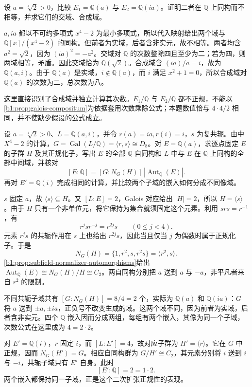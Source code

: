 \begin{exercise}\label{b1:ex:19-two-fourth-root-fields}
	设 \(a=\sqrt[4]2>0\)，比较 \(E_1=\mathbb Q(a)\) 与 \(E_2=\mathbb Q(ia)\)。证明二者在 \(\mathbb Q\) 上同构而不相等，并求它们的交域、合成域。
\end{exercise}
\begin{solution}
	\(a,ia\) 都以不可约多项式 \(x^4-2\) 为最小多项式，所以代入映射给出两个域与 \(\mathbb Q[x]/(x^4-2)\) 的同构。但前者为实域，后者含非实元，故不相等。两者均含 \(a^2=\sqrt2\)，因为 \((ia)^2=-a^2\)。交域对 \(\mathbb Q\) 的次数整除四且至少为二；若为四，则两域相等，矛盾。因此交域恰为 \(\mathbb Q(\sqrt2)\)。合成域含 \((ia)/a=i\)，故为 \(\mathbb Q(a,i)\)。由于 \(\mathbb Q(a)\) 是实域，\(i\notin\mathbb Q(a)\)，而 \(i\) 满足 \(x^2+1=0\)，所以合成域对 \(\mathbb Q(a)\) 的次数为二，总次数为八。

	这里直接识别了合成域并独立计算其次数。\(E_1/\mathbb Q\) 与 \(E_2/\mathbb Q\) 都不正规，不能以\cref{b1:prop:galois-compositum}为依据套用次数乘除公式；本题数值恰与 \(4\cdot4/2\) 相同，并不使缺少假设的公式成立。
\end{solution}

\begin{exercise}\label{b1:ex:19-normalizer-automorphisms}
	设 \(a=\sqrt[4]2>0\)、\(L=\mathbb Q(a,i)\)，并令 \(r(a)=ia,r(i)=i\)，\(s\) 为复共轭。由中 \(X^4-2\) 的计算，\(G=\operatorname{Gal}(L/\mathbb Q)=\langle r,s\rangle\cong D_8\)。对 \(E=\mathbb Q(a)\)，求逐点固定 \(E\) 的子群 \(H\) 及其正规化子，写出 \(E\) 的全部 \(\mathbb Q\) 自同构和 \(L\) 中与 \(E\) 在 \(\mathbb Q\) 上同构的全部中间域，并核对
	\[
		[E:\mathbb Q]=[G:N_G(H)]\,|\operatorname{Aut}_{\mathbb Q}(E)|.
	\]
	再对 \(E'=\mathbb Q(i)\) 完成相同的计算，并比较两个子域的嵌入如何分成不同像域。
\end{exercise}
\begin{solution}
	\(s\) 固定 \(a\)，故 \(\langle s\rangle\subseteq H\)。又 \([L:E]=2\)，Galois 对应给出 \(|H|=2\)，所以 \(H=\langle s\rangle\)。由于 \(H\) 只有一个非单位元，将它保持为集合就须固定这个元素。利用 \(srs=r^{-1}\)，有
	\[
		r^j s r^{-j}=r^{2j}s\qquad(0\leq j<4).
	\]
	元素 \(r^js\) 的共轭作用在 \(s\) 上也给出 \(r^{2j}s\)，因此当且仅当 \(j\) 为偶数时属于正规化子。于是
	\[
		N_G(H)=\{1,r^2,s,r^2s\}=\langle r^2,s\rangle.
	\]
	\cref{b1:prop:subfield-normalizer-automorphisms}给出 \(\operatorname{Aut}_{\mathbb Q}(E)\cong N_G(H)/H\cong C_2\)。两自同构分别把 \(a\) 送到 \(a\) 与 \(-a\)，非平凡者来自 \(r^2\) 的限制。

	不同共轭子域共有 \([G:N_G(H)]=8/4=2\) 个，实际为 \(\mathbb Q(a)\) 和 \(\mathbb Q(ia)\)：\(G\) 将 \(a\) 送到 \(\pm a,\pm ia\)，正负号不改变生成的域。这两个域不同，因为前者为实域，后者含非实元。四个 \(\mathbb Q\) 嵌入因而分成两组，每组有两个嵌入，其像为同一个子域，次数公式在这里成为 \(4=2\cdot2\)。

	对 \(E'=\mathbb Q(i)\)，\(r\) 固定 \(i\)，而 \([L:E']=4\)，故对应子群为 \(H'=\langle r\rangle\)。它在 \(G\) 中正规，因而 \(N_G(H')=G\)。相应自同构群为 \(G/H'\cong C_2\)，其元素分别将 \(i\) 送到 \(i\) 与 \(-i\)，共轭子域只有 \(E'\) 自身。此时
	\[
		[E':\mathbb Q]=2=1\cdot2.
	\]
	两个嵌入都保持同一子域，正是这个二次扩张正规性的表现。
\end{solution}

